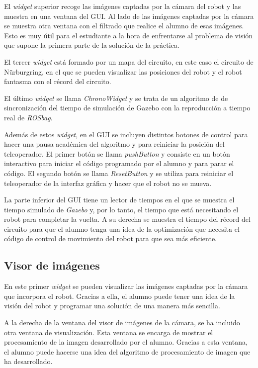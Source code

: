 El \textit{widget} superior recoge las imágenes captadas por la cámara del robot  y las muestra en una ventana del GUI. Al lado de las imágenes captadas por la cámara se muestra otra ventana con el filtrado que realice el alumno de esas imágenes. Esto es muy útil para el estudiante a la hora de enfrentarse al problema de visión que supone la primera parte de la solución de la práctica.

El tercer \textit{widget} está formado por un mapa del circuito, en este caso el circuito de Nürburgring, en el que se pueden visualizar las posiciones del robot y el robot fantasma con el récord del circuito.

El último \textit{widget} se llama \textit{ChronoWidget} y se trata de un algoritmo de de sincronización del tiempo de simulación de Gazebo con la reproducción a tiempo real de \textit{ROSbag}.

Además de estos \textit{widget}, en el GUI se incluyen distintos botones de control para hacer una pausa académica del algoritmo y para reiniciar la posición del teleoperador. El primer botón se llama \textit{pushButton} y consiste en un botón interactivo para iniciar el código programado por el alumno y para parar el código. El segundo botón se llama \textit{ResetButton} y se utiliza para reiniciar el teleoperador de la interfaz gráfica y hacer que el robot no se mueva.

La parte inferior del GUI tiene un lector de tiempos en el que se muestra el tiempo simulado de \textit{Gazebo} y, por lo tanto, el tiempo que está necesitando el robot para completar la vuelta. A su derecha se muestra el tiempo del récord del circuito para que el alumno tenga una idea de la optimización que necesita el código de control de movimiento del robot para que sea más eficiente.

\subsection{Visor de imágenes}
En este primer \textit{widget} se pueden visualizar las imágenes captadas por la cámara que incorpora el robot. Gracias a ella, el alumno puede tener una idea de la visión del robot y programar una solución de una manera más sencilla.

A la derecha de la ventana del visor de imágenes de la cámara, se ha incluido otra ventana de visualización. Esta ventana se encarga de mostrar el procesamiento de la imagen desarrollado por el alumno. Gracias a esta ventana, el alumno puede hacerse una idea del algoritmo de procesamiento de imagen que ha desarrollado.

